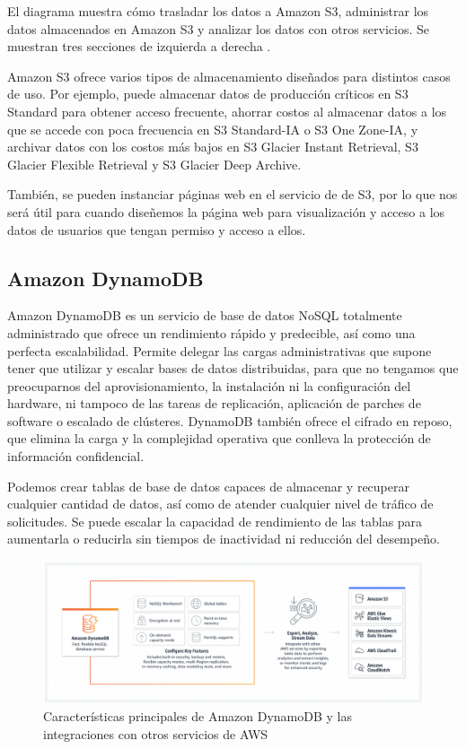 El diagrama muestra cómo trasladar los datos a Amazon S3, administrar los datos almacenados en Amazon S3 y analizar los datos con otros servicios. Se muestran tres secciones de izquierda a derecha \cite{132}.

Amazon S3 ofrece varios tipos de almacenamiento diseñados para distintos casos de uso. Por ejemplo, puede almacenar datos de producción críticos en S3 Standard para obtener acceso frecuente, ahorrar costos al almacenar datos a los que se accede con poca frecuencia en S3 Standard-IA o S3 One Zone-IA, y archivar datos con los costos más bajos en S3 Glacier Instant Retrieval, S3 Glacier Flexible Retrieval y S3 Glacier Deep Archive.

También, se pueden instanciar páginas web en el servicio de de S3, por lo que nos será útil para cuando diseñemos la página web para visualización y acceso a los datos de usuarios que tengan permiso y acceso a ellos.

\subsection{Amazon DynamoDB}
Amazon DynamoDB es un servicio de base de datos NoSQL totalmente administrado que ofrece un rendimiento rápido y predecible, así como una perfecta escalabilidad. Permite delegar las cargas administrativas que supone tener que utilizar y escalar bases de datos distribuidas, para que no tengamos que preocuparnos del aprovisionamiento, la instalación ni la configuración del hardware, ni tampoco de las tareas de replicación, aplicación de parches de software o escalado de clústeres. DynamoDB también ofrece el cifrado en reposo, que elimina la carga y la complejidad operativa que conlleva la protección de información confidencial. 

Podemos crear tablas de base de datos capaces de almacenar y recuperar cualquier cantidad de datos, así como de atender cualquier nivel de tráfico de solicitudes. Se puede escalar la capacidad de rendimiento de las tablas para aumentarla o reducirla sin tiempos de inactividad ni reducción del desempeño.

\begin{figure}[hbtp]
\centering
\includegraphics[width=\textwidth]{imagenes/dynamodb.png}
\caption{Características principales de Amazon DynamoDB y las integraciones con otros servicios de AWS}
\end{figure}


